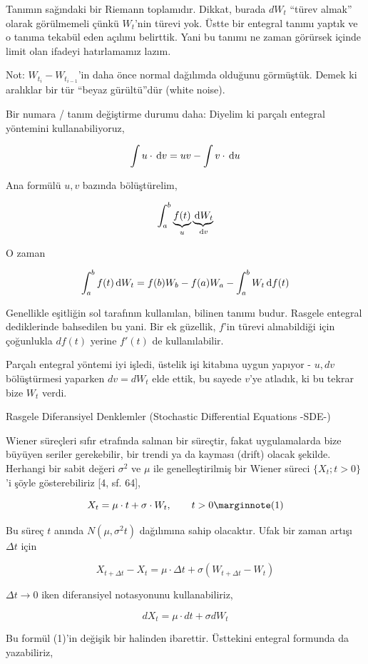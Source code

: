 \documentclass[12pt,fleqn]{article}\usepackage{../../common}
\begin{document}
Tanımın sağındaki bir Riemann toplamıdır. Dikkat, burada $dW_t$ ``türev almak''
olarak görülmemeli çünkü $W_t$'nin türevi yok. Üstte bir entegral tanımı yaptık
ve o tanıma tekabül eden açılımı belirttik. Yani bu tanımı ne zaman görürsek
içinde limit olan ifadeyi hatırlamamız lazım.

Not: $W_{t_i} - W_{t_{i-1}}$'in daha önce normal dağılımda olduğunu
görmüştük. Demek ki aralıklar bir tür ``beyaz gürültü''dür (white noise).

Bir numara / tanım değiştirme durumu daha: Diyelim ki parçalı entegral yöntemini
kullanabiliyoruz,

$$ \int u \cdot \,\mathrm{d} v = uv - \int v \cdot \,\mathrm{d} u $$

Ana formülü $u,v$ bazında bölüştürelim,

$$ \int _{a}^{b} \underbrace{f(t)}_{u}\underbrace{\,\mathrm{d} W_t}_{\,\mathrm{d} v}$$

O zaman 

$$ \int _{a}^{b} f(t)\,\mathrm{d} W_t = f(b)W_b - f(a)W_a - \int _{a}^{b} W_t \,\mathrm{d} f(t) $$

Genellikle eşitliğin sol tarafının kullanılan, bilinen tanımı budur. Rasgele
entegral dediklerinde bahsedilen bu yani. Bir ek güzellik, $f$'in türevi
alınabildiği için çoğunlukla $df(t)$ yerine $f'(t)$ de kullanılabilir.

Parçalı entegral yöntemi iyi işledi, üstelik işi kitabına uygun yapıyor - $u,dv$
bölüştürmesi yaparken $dv=dW_t$ elde ettik, bu sayede $v$'ye atladık, ki bu
tekrar bize $W_t$ verdi.

Rasgele Diferansiyel Denklemler (Stochastic Differential Equations -SDE-)

Wiener süreçleri sıfır etrafında salınan bir süreçtir, fakat uygulamalarda bize
büyüyen seriler gerekebilir, bir trendi ya da kayması (drift) olacak
şekilde. Herhangi bir sabit değeri $\sigma^2$ ve $\mu$ ile genelleştirilmiş bir
Wiener süreci $\{ X_t; t>0\}$'i şöyle gösterebiliriz [4, sf. 64],

$$ 
X_t = \mu \cdot t + \sigma \cdot W_t, \qquad t>0 
\mlabel{1}
$$

Bu süreç $t$ anında $N(\mu,\sigma^2t)$ dağılımına sahip olacaktır. Ufak bir
zaman artışı $\Delta t$ için

$$ X_{t + \Delta t} - X_t = \mu \cdot \Delta t + \sigma (W_{t+\Delta t}-W_t)$$

$\Delta t \to 0$ iken diferansiyel notasyonunu kullanabiliriz, 

$$ dX_t = \mu \cdot dt + \sigma dW_t $$

Bu formül (1)'in değişik bir halinden ibarettir. Üsttekini entegral
formunda da yazabiliriz, 
\end{document}
